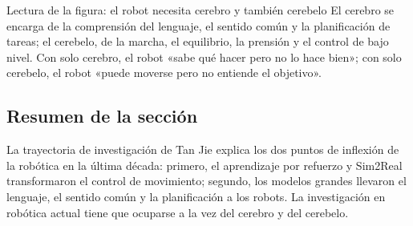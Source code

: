 \begin{knowledgebox}{Lectura de la figura: el robot necesita cerebro y también cerebelo}
El cerebro se encarga de la comprensión del lenguaje, el sentido común y la planificación de tareas; el cerebelo, de la marcha, el equilibrio, la prensión y el control de bajo nivel. Con solo cerebro, el robot «sabe qué hacer pero no lo hace bien»; con solo cerebelo, el robot «puede moverse pero no entiende el objetivo».
\end{knowledgebox}

\subsection{Resumen de la sección}

La trayectoria de investigación de Tan Jie explica los dos puntos de inflexión de la robótica en la última década: primero, el aprendizaje por refuerzo y Sim2Real transformaron el control de movimiento; segundo, los modelos grandes llevaron el lenguaje, el sentido común y la planificación a los robots. La investigación en robótica actual tiene que ocuparse a la vez del cerebro y del cerebelo.
